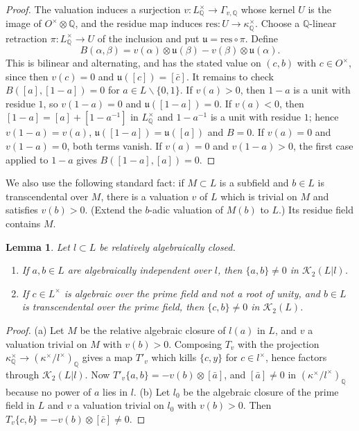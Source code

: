 \documentclass[11pt]{amsart}
\newtheorem{lemma}[theorem]{Lemma}
\theoremstyle{definition}
\theoremstyle{remark}
\newcommand{\QQ}{\mathbb{Q}}
\newcommand{\sm}{\smallsetminus}
\newcommand{\Kr}{\mathcal{K}}
\begin{document}
\begin{proof}
The valuation induces a surjection $v\colon L^\times_\QQ\to\Gamma_{v,\QQ}$ whose kernel $U$ is the image of $O^\times\otimes\QQ$, and the residue map induces $\mathrm{res}\colon U\to\kappa^\times_\QQ$.
Choose a $\QQ$-linear retraction $\pi\colon L^\times_\QQ\to U$ of the inclusion and put $\mathfrak u=\mathrm{res}\circ\pi$. Define
\[ B(\alpha,\beta)=v(\alpha)\otimes\mathfrak u(\beta)-v(\beta)\otimes\mathfrak u(\alpha). \]
This is bilinear and alternating, and has the stated value on $(c,b)$ with $c\in O^\times$, since then $v(c)=0$ and $\mathfrak u([c])=[\bar c]$. It remains to check $B([a],[1-a])=0$ for $a\in L\sm\{0,1\}$.
If $v(a)>0$, then $1-a$ is a unit with residue $1$, so $v(1-a)=0$ and $\mathfrak u([1-a])=0$.
If $v(a)<0$, then $[1-a]=[a]+[1-a^{-1}]$ in $L^\times_\QQ$ and $1-a^{-1}$ is a unit with residue $1$; hence $v(1-a)=v(a)$, $\mathfrak u([1-a])=\mathfrak u([a])$ and $B=0$.
If $v(a)=0$ and $v(1-a)=0$, both terms vanish. If $v(a)=0$ and $v(1-a)>0$, the first case applied to $1-a$ gives $B([1-a],[a])=0$.
\end{proof}

We also use the following standard fact: if $M\subset L$ is a subfield and $b\in L$ is transcendental over $M$, there is a valuation $v$ of $L$ which is trivial on $M$ and satisfies $v(b)>0$.
(Extend the $b$-adic valuation of $M(b)$ to $L$.) Its residue field contains $M$.

\begin{lemma}\label{lem:symbols}
Let $l\subset L$ be relatively algebraically closed.
\begin{enumerate}[label=\textup{(\alph*)}]
\item If $a,b\in L$ are algebraically independent over $l$, then $\{a,b\}\neq0$ in $\Kr_2(L|l)$.
\item If $c\in L^\times$ is algebraic over the prime field and not a root of unity, and $b\in L$ is transcendental over the prime field, then $\{c,b\}\ne0$ in $\Kr_2(L)$.
\end{enumerate}
\end{lemma}

\begin{proof}
(a) Let $M$ be the relative algebraic closure of $l(a)$ in $L$, and $v$ a valuation trivial on $M$ with $v(b)>0$. Composing $T_v$ with the projection $\kappa^\times_\QQ\to(\kappa^\times/l^\times)_\QQ$ gives a map $T'_v$ which kills $\{c,y\}$ for $c\in l^\times$,
hence factors through $\Kr_2(L|l)$. Now $T'_v\{a,b\}=-v(b)\otimes[\bar a]$, and $[\bar a]\neq0$ in $(\kappa^\times/l^\times)_\QQ$ because no power of $a$ lies in $l$.
(b) Let $l_0$ be the algebraic closure of the prime field in $L$ and $v$ a valuation trivial on $l_0$ with $v(b)>0$. Then $T_v\{c,b\}=-v(b)\otimes[\bar c]\ne0$.
\end{proof}
\end{document}
